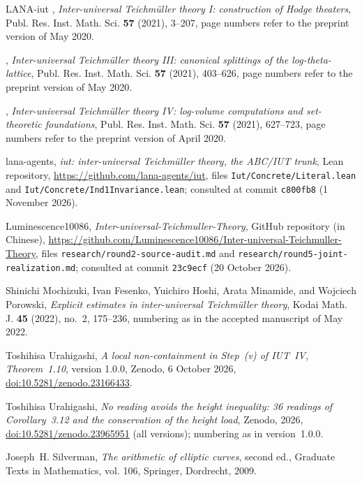 \documentclass[11pt]{amsart}
\theoremstyle{remark}
\begin{document}
\begin{thebibliography}{LANA-iut}
\bysame, \emph{Inter-universal {T}eichm\"uller theory {I}: construction of
  {H}odge theaters}, Publ. Res. Inst. Math. Sci. \textbf{57} (2021), 3--207,
  page numbers refer to the preprint version of May 2020.

\bysame, \emph{Inter-universal {T}eichm\"uller theory {III}: canonical
  splittings of the log-theta-lattice}, Publ. Res. Inst. Math. Sci. \textbf{57}
  (2021), 403--626, page numbers refer to the preprint version of May 2020.

\bysame, \emph{Inter-universal {T}eichm\"uller theory {IV}: log-volume
  computations and set-theoretic foundations}, Publ. Res. Inst. Math. Sci.
  \textbf{57} (2021), 627--723, page numbers refer to the preprint version of
  April 2020.

lana-agents, \emph{iut: inter-universal {T}eichm\"uller theory, the ABC/IUT trunk}, Lean
  repository, \url{https://github.com/lana-agents/iut}, files
  \texttt{Iut/Concrete/Literal.lean} and \texttt{Iut/Concrete/Ind1Invariance.lean};
  consulted at commit \texttt{c800fb8} (1 November 2026).

Luminescence10086, \emph{Inter-universal-Teichmuller-Theory}, GitHub repository (in Chinese),
  \url{https://github.com/Luminescence10086/Inter-universal-Teichmuller-Theory}, files
  \texttt{research/round2-source-audit.md} and \texttt{research/round5-joint-realization.md};
  consulted at commit \texttt{23c9ecf} (20 October 2026).

Shinichi Mochizuki, Ivan Fesenko, Yuichiro Hoshi, Arata Minamide, and Wojciech
  Porowski, \emph{Explicit estimates in inter-universal {T}eichm\"uller
  theory}, Kodai Math. J. \textbf{45} (2022), no.~2, 175--236, numbering as in
  the accepted manuscript of May 2022.

Toshihisa Urahigashi, \emph{A local non-containment in Step~(v) of {IUT}~{IV}, Theorem~1.10},
  version 1.0.0, Zenodo, 6 October 2026,
  \href{https://doi.org/10.5281/zenodo.23166433}{doi:10.5281/zenodo.23166433}.

Toshihisa Urahigashi, \emph{No reading avoids the height inequality: 36 readings of {C}orollary~3.12 and the
  conservation of the height load}, Zenodo, 2026,
  \href{https://doi.org/10.5281/zenodo.23965951}{doi:10.5281/zenodo.23965951} (all versions); numbering as in
  version~1.0.0.

Joseph~H. Silverman, \emph{The arithmetic of elliptic curves}, second ed.,
  Graduate Texts in Mathematics, vol. 106, Springer, Dordrecht, 2009.


\end{thebibliography}
\end{document}
